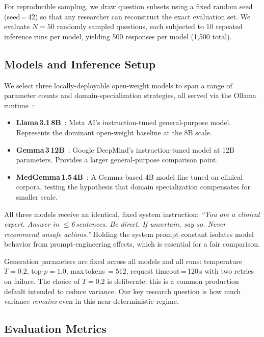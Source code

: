 \documentclass[11pt]{article}
\begin{document}
For reproducible sampling, we draw question subsets using a fixed
random seed (seed\,=\,42) so that any researcher can reconstruct the
exact evaluation set.
We evaluate $N{=}50$ randomly sampled questions, each subjected to
10 repeated inference runs per model, yielding 500 responses per
model (1,500 total).

\subsection{Models and Inference Setup}

We select three locally-deployable open-weight models to span a range
of parameter counts and domain-specialization strategies, all served
via the Ollama runtime~\cite{ollama}:

\begin{itemize}
  \item \textbf{Llama\,3.1\,8B}~\cite{dubey2024llama3}:
        Meta AI's instruction-tuned general-purpose model.
        Represents the dominant open-weight baseline at the 8B scale.
  \item \textbf{Gemma\,3\,12B}~\cite{team2024gemma}:
        Google DeepMind's instruction-tuned model at 12B parameters.
        Provides a larger general-purpose comparison point.
  \item \textbf{MedGemma\,1.5\,4B}~\cite{medgemma2024}:
        A Gemma-based 4B model fine-tuned on clinical corpora,
        testing the hypothesis that domain specialization compensates
        for smaller scale.
\end{itemize}

All three models receive an identical, fixed system instruction:
\textit{``You are a clinical expert. Answer in $\leq$6\,sentences.
Be direct. If uncertain, say so. Never recommend unsafe actions.''}
Holding the system prompt constant isolates model behavior from
prompt-engineering effects, which is essential for a fair comparison.

Generation parameters are fixed across all models and all runs:
temperature $T{=}0.2$, top-$p{=}1.0$, max\,tokens\,$=512$,
request timeout\,=\,120\,s with two retries on failure.
The choice of $T{=}0.2$ is deliberate: this is a common production
default intended to reduce variance.
Our key research question is how much variance \emph{remains} even
in this near-deterministic regime.

\subsection{Evaluation Metrics}
\label{sec:metrics}
\end{document}
